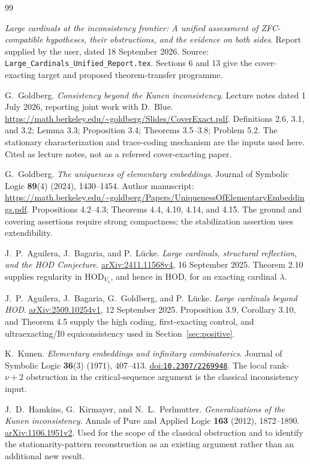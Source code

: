 \documentclass[11pt,letterpaper]{article}
\theoremstyle{definition}
\newcommand{\HOD}{\mathrm{HOD}}
\newcommand{\Izero}{\mathrm{I0}}
\newcommand{\arxiv}[1]{\href{https://arxiv.org/abs/#1}{arXiv:#1}}
\newcommand{\doi}[1]{\href{https://doi.org/#1}{doi:\nolinkurl{#1}}}
\begin{document}
\vspace{10pt}
{}
\begin{thebibliography}{99}
\small
\setlength{\itemsep}{7pt}
\setlength{\parskip}{1pt}

\emph{Large cardinals at the inconsistency frontier: A unified assessment of
ZFC-compatible hypotheses, their obstructions, and the evidence on both sides}.
Report supplied by the user, dated 18 September 2026.
Source: \nolinkurl{Large_Cardinals_Unified_Report.tex}.
Sections 6 and 13 give the cover-exacting target and proposed theorem-transfer programme.

G.~Goldberg. \emph{Consistency beyond the Kunen inconsistency}.
Lecture notes dated 1 July 2026, reporting joint work with D.~Blue.
\url{https://math.berkeley.edu/~goldberg/Slides/CoverExact.pdf}.
Definitions 2.6, 3.1, and 3.2; Lemma 3.3; Proposition 3.4;
Theorems 3.5--3.8; Problem 5.2.
The stationary characterization and trace-coding mechanism are the inputs
used here. Cited as lecture notes, not as a refereed cover-exacting paper.

G.~Goldberg. \emph{The uniqueness of elementary embeddings}.
Journal of Symbolic Logic \textbf{89}(4) (2024), 1430--1454.
Author manuscript:
\url{https://math.berkeley.edu/~goldberg/Papers/UniquenessOfElementaryEmbeddings.pdf}.
Propositions 4.2--4.3; Theorems 4.4, 4.10, 4.14, and 4.15.
The ground and covering assertions require strong compactness; the
stabilization assertion uses extendibility.

J.~P.~Aguilera, J.~Bagaria, and P.~L\"ucke.
\emph{Large cardinals, structural reflection, and the HOD Conjecture}.
\arxiv{2411.11568v4}, 16 September 2025.
Theorem 2.10 supplies regularity in $\HOD_{V_\lambda}$, and hence in HOD,
for an exacting cardinal $\lambda$.

J.~P.~Aguilera, J.~Bagaria, G.~Goldberg, and P.~L\"ucke.
\emph{Large cardinals beyond HOD}.
\arxiv{2509.10254v1}, 12 September 2025.
Proposition 3.9, Corollary 3.10, and Theorem 4.5 supply the high coding,
first-exacting control, and ultraexacting/$\Izero$ equiconsistency used in
Section~\ref{sec:positive}.

K.~Kunen. \emph{Elementary embeddings and infinitary combinatorics}.
Journal of Symbolic Logic \textbf{36}(3) (1971), 407--413.
\doi{10.2307/2269948}.
The local rank-$\nu+2$ obstruction in the critical-sequence argument is the
classical inconsistency input.

J.~D.~Hamkins, G.~Kirmayer, and N.~L.~Perlmutter.
\emph{Generalizations of the Kunen inconsistency}.
Annals of Pure and Applied Logic \textbf{163} (2012), 1872--1890.
\arxiv{1106.1951v2}.
Used for the scope of the classical obstruction and to identify the
stationarity-pattern reconstruction as an existing argument rather than
an additional new result.

\end{thebibliography}
\end{document}
